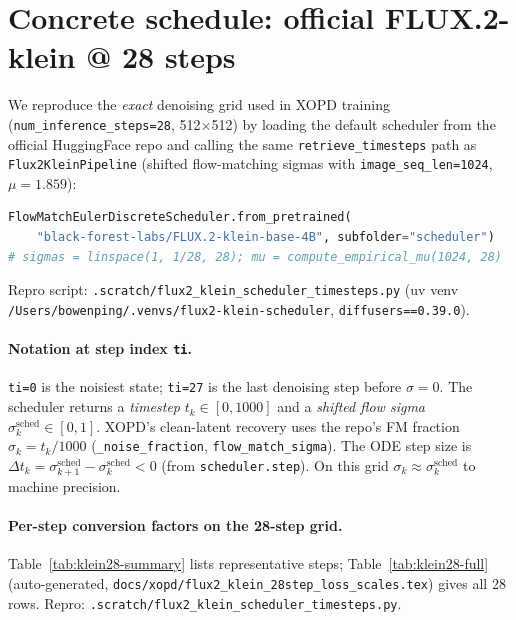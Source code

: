 \documentclass[11pt,a4paper]{article}
\begin{document}
\section{Concrete schedule: official FLUX.2-klein @ 28 steps}
\label{sec:schedule}

We reproduce the \emph{exact} denoising grid used in XOPD training
(\texttt{num\_inference\_steps=28}, 512$\times$512) by loading the default scheduler from the
official HuggingFace repo and calling the same \texttt{retrieve\_timesteps} path as
\texttt{Flux2KleinPipeline} (shifted flow-matching sigmas with
\texttt{image\_seq\_len=1024}, $\mu=1.859$):
\begin{lstlisting}[language=Python,basicstyle=\ttfamily\footnotesize,frame=none]
FlowMatchEulerDiscreteScheduler.from_pretrained(
    "black-forest-labs/FLUX.2-klein-base-4B", subfolder="scheduler")
# sigmas = linspace(1, 1/28, 28); mu = compute_empirical_mu(1024, 28)
\end{lstlisting}
Repro script: \texttt{.scratch/flux2\_klein\_scheduler\_timesteps.py} (uv venv
\texttt{/Users/bowenping/.venvs/flux2-klein-scheduler}, \texttt{diffusers==0.39.0}).

\paragraph{Notation at step index \texttt{ti}.}
\texttt{ti=0} is the noisiest state; \texttt{ti=27} is the last denoising step before $\sigma=0$.
The scheduler returns a \emph{timestep} $t_k\in[0,1000]$ and a \emph{shifted flow sigma}
$\sigma^{\mathrm{sched}}_k\in[0,1]$. XOPD's clean-latent recovery uses the repo's FM fraction
$\sigma_k=t_k/1000$ (\texttt{\_noise\_fraction}, \texttt{flow\_match\_sigma}). The ODE step size is
$\Delta t_k=\sigma^{\mathrm{sched}}_{k+1}-\sigma^{\mathrm{sched}}_k<0$ (from
\texttt{scheduler.step}). On this grid $\sigma_k\approx\sigma^{\mathrm{sched}}_k$ to machine
precision.

\paragraph{Per-step conversion factors on the 28-step grid.}
Table~\ref{tab:klein28-summary} lists representative steps; Table~\ref{tab:klein28-full}
(auto-generated, \texttt{docs/xopd/flux2\_klein\_28step\_loss\_scales.tex}) gives all 28 rows.
Repro: \texttt{.scratch/flux2\_klein\_scheduler\_timesteps.py}.
\end{document}

